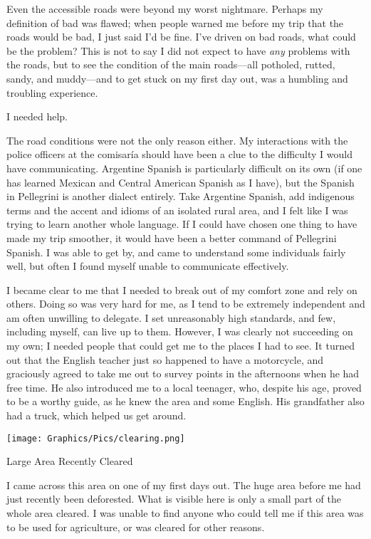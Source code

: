 Even the accessible roads were beyond my worst nightmare. Perhaps my definition of bad was flawed; when people warned me before my trip that the roads would be bad, I just said I’d be fine. I’ve driven on bad roads, what could be the problem? This is not to say I did not expect to have \textit{any} problems with the roads, but to see the condition of the main roads---all potholed, rutted, sandy, and muddy---and to get stuck on my first day out, was a humbling and troubling experience.

I needed help.

The road conditions were not the only reason either. My interactions with the police officers at the comisaría should have been a clue to the difficulty I would have communicating. Argentine Spanish is particularly difficult on its own (if one has learned Mexican and Central American Spanish as I have), but the Spanish in Pellegrini is another dialect entirely. Take Argentine Spanish, add indigenous terms and the accent and idioms of an isolated rural area, and I felt like I was trying to learn another whole language. If I could have chosen one thing to have made my trip smoother, it would have been a better command of Pellegrini Spanish. I was able to get by, and came to understand some individuals fairly well, but often I found myself unable to communicate effectively.

I became clear to me that I needed to break out of my comfort zone and rely on others. Doing so was very hard for me, as I tend to be extremely independent and am often unwilling to delegate. I set unreasonably high standards, and few, including myself, can live up to them. However, I was clearly not succeeding on my own; I needed people that could get me to the places I had to see. It turned out that the English teacher just so happened to have a motorcycle, and graciously agreed to take me out to survey points in the afternoons when he had free time. He also introduced me to a local teenager, who, despite his age, proved to be a worthy guide, as he knew the area and some English. His grandfather also had a truck, which helped us get around.

\begin{ssfigure}
  \centering
  \texttt{[image: Graphics/Pics/clearing.png]}
  \caption{Large Area Recently Cleared}
  \label{pic:clearing}
  \medskip
  \small
  I came across this area on one of my first days out. The huge area before me had just recently been deforested. What is visible here is only a small part of the whole area cleared. I was unable to find anyone who could tell me if this area was to be used for agriculture, or was cleared for other reasons.
\end{ssfigure}

